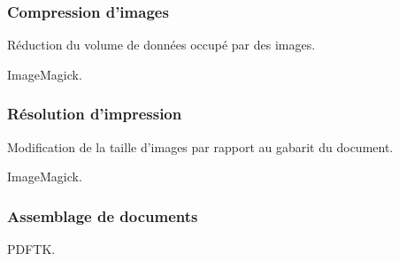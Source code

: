 \subsubsection{Compression d’images}

Réduction du volume de données occupé par des images.

ImageMagick.

\subsubsection{Résolution d’impression}

Modification de la taille d’images par rapport au gabarit du document.

ImageMagick.

\subsubsection{Assemblage de documents}

PDFTK.

\pagebreak
